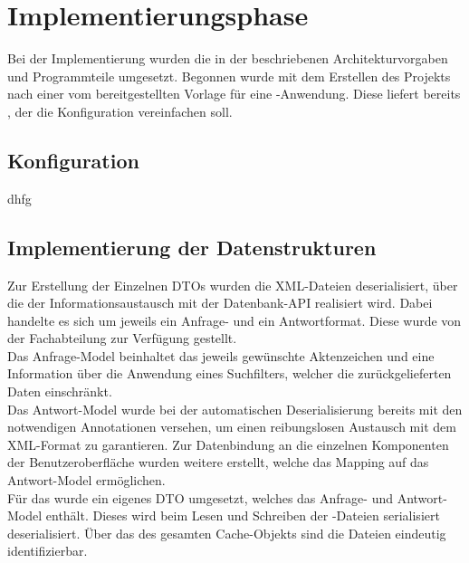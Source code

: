 \section{Implementierungsphase} 
\label{sec:Implementierungsphase}
Bei der Implementierung wurden die in der  beschriebenen Architekturvorgaben
und Programmteile umgesetzt. Begonnen wurde mit dem Erstellen des Projekts nach einer vom 
bereitgestellten Vorlage für eine -Anwendung. Diese liefert bereits ,
der \zB die Konfiguration vereinfachen soll.

\subsection{Konfiguration}
\label{sec:Konfiguration}
dhfg

\subsection{Implementierung der Datenstrukturen}
\label{sec:ImplementierungDatenstrukturen}
Zur Erstellung der Einzelnen \acs{DTO}s wurden die XML-Dateien deserialisiert, über die der Informationsaustausch mit der Datenbank-API
realisiert wird. Dabei handelte es sich um jeweils ein Anfrage- und ein Antwortformat. Diese wurde von der Fachabteilung zur Verfügung
gestellt.\\
Das Anfrage-Model beinhaltet das jeweils gewünschte Aktenzeichen und eine Information über die Anwendung eines Suchfilters,
welcher die zurückgelieferten Daten einschränkt.\\
Das Antwort-Model wurde bei der automatischen Deserialisierung bereits mit den notwendigen Annotationen versehen,
um einen reibungslosen Austausch mit dem XML-Format zu garantieren. Zur Datenbindung an die einzelnen Komponenten der
Benutzeroberfläche wurden weitere  erstellt, welche das Mapping auf das Antwort-Model ermöglichen.\\
Für das  wurde ein eigenes \acs{DTO} umgesetzt, welches das Anfrage- und Antwort-Model enthält.
Dieses wird beim Lesen und Schreiben der -Dateien serialisiert \bzw deserialisiert.
Über das  des gesamten Cache-Objekts sind die Dateien eindeutig identifizierbar.

